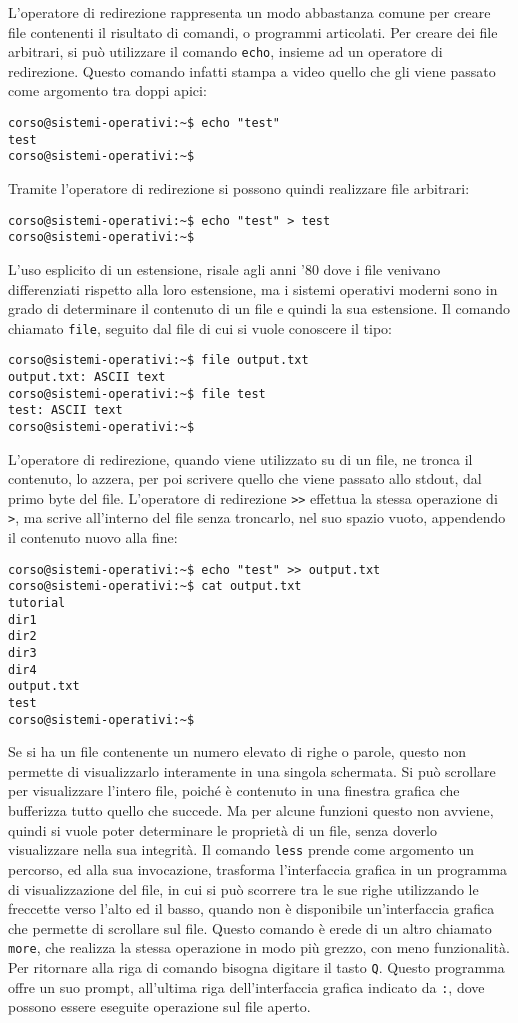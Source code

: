 \documentclass{article}
\numberwithin{equation}{subsection}
\begin{document}
L'operatore di redirezione rappresenta un modo abbastanza comune per creare file contenenti il risultato di comandi, o programmi articolati. 
Per creare dei file arbitrari, si può utilizzare il comando \verb|echo|, insieme ad un operatore di redirezione. Questo comando infatti stampa a video quello che gli viene passato come argomento tra doppi 
apici:
\begin{verbatim}
corso@sistemi-operativi:~$ echo "test"
test
corso@sistemi-operativi:~$
\end{verbatim}
Tramite l'operatore di redirezione si possono quindi realizzare file arbitrari:
\begin{verbatim}
corso@sistemi-operativi:~$ echo "test" > test
corso@sistemi-operativi:~$
\end{verbatim}

L'uso esplicito di un estensione, risale agli anni '80 dove i file venivano differenziati rispetto alla loro estensione, ma i sistemi operativi moderni sono in grado di determinare il contenuto di un file e quindi 
la sua estensione. Il comando chiamato \verb|file|, seguito dal file di cui si vuole conoscere il tipo:
\begin{verbatim}
corso@sistemi-operativi:~$ file output.txt
output.txt: ASCII text
corso@sistemi-operativi:~$ file test
test: ASCII text
corso@sistemi-operativi:~$
\end{verbatim}


L'operatore di redirezione, quando viene utilizzato su di un file, ne tronca il contenuto, lo azzera, per poi scrivere quello che viene passato allo stdout, dal primo byte del file. L'operatore di 
redirezione \verb|>>| effettua la stessa operazione di \verb|>|, ma scrive all'interno del file senza troncarlo, nel suo spazio vuoto, appendendo il contenuto nuovo alla fine:
\begin{verbatim}
corso@sistemi-operativi:~$ echo "test" >> output.txt
corso@sistemi-operativi:~$ cat output.txt
tutorial 
dir1 
dir2
dir3
dir4
output.txt
test
corso@sistemi-operativi:~$
\end{verbatim}

Se si ha un file contenente un numero elevato di righe o parole, questo non permette di visualizzarlo interamente in una singola schermata. Si può scrollare per visualizzare l'intero file, poiché è contenuto in una 
finestra grafica che bufferizza tutto quello che succede. Ma per alcune funzioni questo non avviene, quindi si vuole poter determinare le proprietà di un file, senza doverlo visualizzare nella sua integrità. 
Il comando \verb|less| prende come argomento un percorso, ed alla sua invocazione, trasforma l'interfaccia grafica in un programma di visualizzazione del file, in cui si può scorrere tra le sue righe utilizzando 
le freccette verso l'alto ed il basso, quando non è disponibile un'interfaccia grafica che permette di scrollare sul file. Questo comando è erede di un altro chiamato \verb|more|, che realizza la stessa operazione 
in modo più grezzo, con meno funzionalità. 
Per ritornare alla riga di comando bisogna digitare il tasto \verb|Q|. Questo programma offre un suo prompt, all'ultima riga dell'interfaccia grafica indicato da \verb|:|, dove possono essere eseguite 
operazione sul file aperto. 
\end{document}
